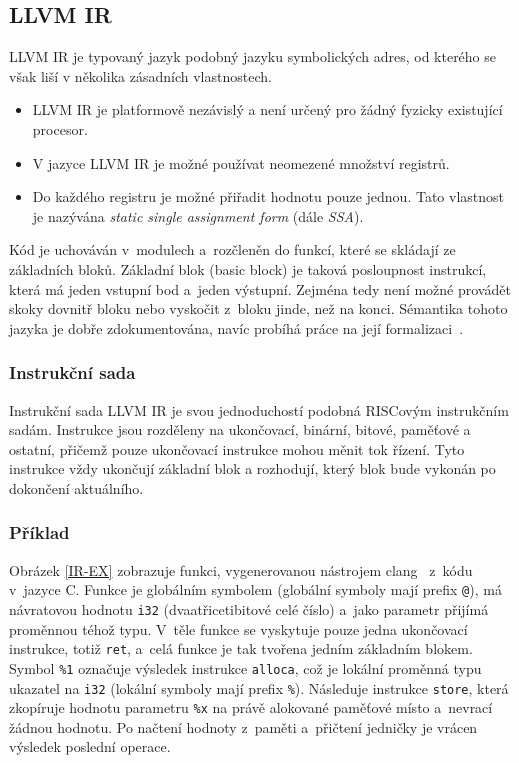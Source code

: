 \documentclass[12pt]{fithesis2}
\begin{document}
\subsection{LLVM IR}
LLVM IR je typovaný jazyk podobný jazyku symbolických adres, od kterého se však liší v několika zásadních vlastnostech.
\begin{itemize}
\item LLVM IR je platformově nezávislý a není určený pro žádný fyzicky existující procesor.
\item V jazyce LLVM IR je možné používat neomezené množství registrů.
\item Do každého registru je možné přiřadit hodnotu pouze jednou. Tato vlastnost je nazývána \textit{static single assignment form} (dále \textit{SSA}).
\end{itemize}
Kód je uchováván v~modulech a~rozčleněn do funkcí, které se skládají ze základních bloků. Základní blok (basic block) je taková posloupnost instrukcí, která má jeden vstupní bod a~jeden výstupní. Zejména tedy není možné provádět skoky dovnitř bloku nebo vyskočit z~bloku jinde, než na konci. Sémantika tohoto jazyka je dobře zdokumentována, navíc probíhá práce na její formalizaci~\cite{LLVMForm}.

\subsubsection{Instrukční sada}
Instrukční sada LLVM IR je svou jednoduchostí podobná RISCovým instrukčním sadám. Instrukce jsou rozděleny na ukončovací, binární, bitové, paměťové a ostatní, přičemž pouze ukončovací instrukce mohou měnit tok řízení. Tyto instrukce vždy ukončují základní blok a rozhodují, který blok bude vykonán po dokončení aktuálního.

\subsubsection{Příklad}
Obrázek \ref{IR-EX} zobrazuje funkci, vygenerovanou nástrojem clang~\cite{clang} z~kódu v~jazyce C. Funkce je globálním symbolem (globální symboly mají prefix \texttt{@}), má návratovou hodnotu \texttt{i32} (dvaatřicetibitové celé číslo) a~jako parametr přijímá proměnnou téhož typu. V~těle funkce se vyskytuje pouze jedna ukončovací instrukce, totiž \texttt{ret}, a~celá funkce je tak tvořena jedním základním blokem. Symbol \texttt{\%1} označuje výsledek instrukce \texttt{alloca}, což je lokální proměnná typu ukazatel na \texttt{i32} (lokální symboly mají prefix \texttt{\%}). Následuje instrukce \texttt{store}, která zkopíruje hodnotu parametru \texttt{\%x} na právě alokované paměťové místo a~nevrací žádnou hodnotu. Po načtení hodnoty z~paměti a~přičtení jedničky je vrácen výsledek poslední operace.
\end{document}
